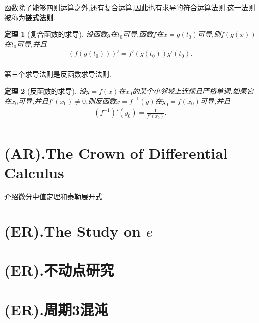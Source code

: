 \documentclass{article}
\newtheorem{theorem}{定理}[subsection]
\begin{document}
\noindent 函数除了能够四则运算之外,还有复合运算,因此也有求导的符合运算法则.这一法则被称为\textbf{链式法则}.

\begin{theorem}[复合函数的求导]
    设函数$g$在$t_0$可导,函数$f$在$x=g(t_0)$可导,则$f(g(x))$在$t_0$可导,并且
    \begin{align*}
        (f(g(t_0)))'=f'(g(t_0))g'(t_0).\\
    \end{align*}
\end{theorem}

\noindent 第三个求导法则是反函数求导法则.

\begin{theorem}[反函数的求导]
    设$y=f(x)$在$x_0$的某个小邻域上连续且严格单调.如果它在$x_0$可导,并且$f'(x_0)\neq 0$,则反函数$x=f^{-1}(y)$在$y_0=f(x_0)$可导,并且
    \begin{align*}
        (f^{-1})'(y_0)=\frac1{f'(x_0)}.\\
    \end{align*}
\end{theorem}





\newpage



\section{(AR).The Crown of Differential Calculus}
\noindent 介绍微分中值定理和泰勒展开式



\newpage



\section{(ER).The Study on $e$}



\newpage


\section{(ER).不动点研究}

\newpage


\section{(ER).周期3混沌}

\newpage
\end{document}
